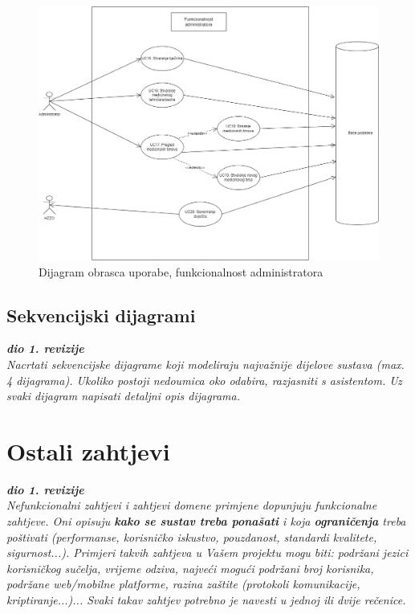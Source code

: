 				    \begin{figure}[H]
			            \includegraphics[width=\textwidth]{slike/administrator_usecase.png} %
			            \caption{Dijagram obrasca uporabe, funkcionalnost administratora}
			            \label{fig:promjene2} %
		            \end{figure}
		            
		            \eject
		            
			\subsection{Sekvencijski dijagrami}
				
				\textbf{\textit{dio 1. revizije}}\\
				
				\textit{Nacrtati sekvencijske dijagrame koji modeliraju najvažnije dijelove sustava (max. 4 dijagrama). Ukoliko postoji nedoumica oko odabira, razjasniti s asistentom. Uz svaki dijagram napisati detaljni opis dijagrama.}
				\eject
	
		\section{Ostali zahtjevi}
		
			\textbf{\textit{dio 1. revizije}}\\
		 
			 \textit{Nefunkcionalni zahtjevi i zahtjevi domene primjene dopunjuju funkcionalne zahtjeve. Oni opisuju \textbf{kako se sustav treba ponašati} i koja \textbf{ograničenja} treba poštivati (performanse, korisničko iskustvo, pouzdanost, standardi kvalitete, sigurnost...). Primjeri takvih zahtjeva u Vašem projektu mogu biti: podržani jezici korisničkog sučelja, vrijeme odziva, najveći mogući podržani broj korisnika, podržane web/mobilne platforme, razina zaštite (protokoli komunikacije, kriptiranje...)... Svaki takav zahtjev potrebno je navesti u jednoj ili dvije rečenice.}
			 
			 
			 
	